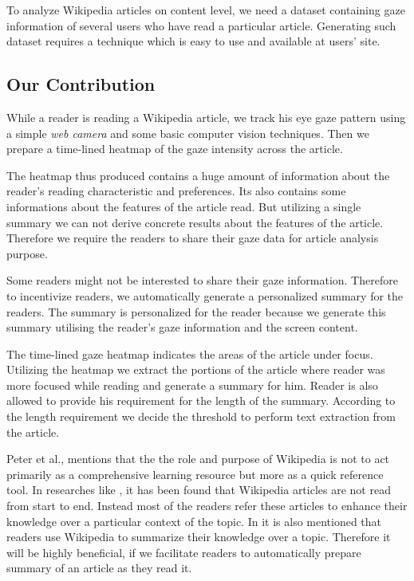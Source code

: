 \documentclass[12pt]{article}
\begin{document}
To analyze Wikipedia articles on content level, we need a dataset containing gaze information of several users who have read a particular article. Generating such dataset requires a technique which is easy to use and available at users' site. 


\subsection{Our Contribution}

While a reader is reading a Wikipedia article, we track his eye gaze pattern using a simple \emph{web camera} and some basic computer vision techniques. Then we prepare a time-lined heatmap of the gaze intensity across the article. 

The heatmap thus produced contains a huge amount of information about the reader's reading characteristic and preferences. Its also contains some informations about the features of the article read. But utilizing a single summary we can not derive concrete results about the features of the article. Therefore we require the readers to share their gaze data for article analysis purpose.

Some readers might not be interested to share their gaze information. Therefore to incentivize readers, we automatically generate a personalized summary for the readers. The summary is personalized for the reader because we generate this summary utilising the reader's gaze information and the screen content.

The time-lined gaze heatmap indicates the areas of the article under focus. Utilizing the heatmap we extract the portions of the article where reader was more focused while reading and generate a summary for him. Reader is also allowed to provide his requirement for the length of the summary. According to the length requirement we decide the threshold to perform text extraction from the article. 

Peter et al.\cite{dunn2019evaluating}, mentions that the the role and purpose of Wikipedia is not to act primarily as a comprehensive learning resource but more as a quick reference tool. In researches like \cite{olsen2012just, head2010today}, it has been found that Wikipedia articles are not read from start to end. Instead most of the readers refer these articles to enhance their knowledge over a particular context of the topic. In \cite{head2010today} it is also mentioned that readers use Wikipedia to summarize their knowledge over a topic. Therefore it will be highly beneficial, if we facilitate readers to automatically prepare summary of an article as they read it.
\end{document}

